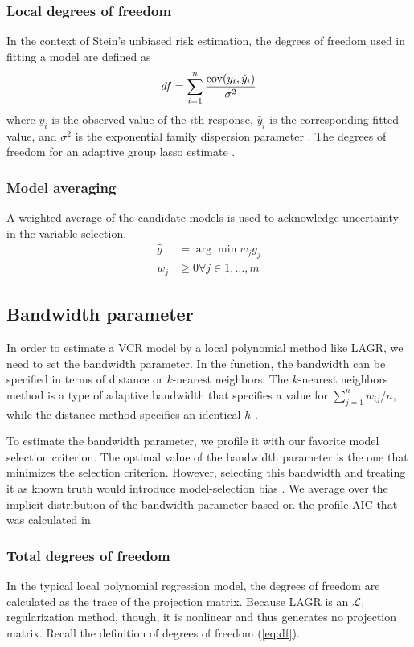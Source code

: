 \subsubsection{Local degrees of freedom}
In the context of Stein's unbiased risk estimation, the degrees of freedom used in fitting a model are defined as 
\begin{equation}
df = \sum_{i=1}^n \frac{{\rm cov}(y_i, \hat{y}_i)}{\sigma^2}
\end{equation}
where $y_i$ is the observed value of the $i$th response, $\hat{y}_i$ is the corresponding fitted value, and $\sigma^2$ is the exponential family dispersion parameter \citep{Efron-1986}. The degrees of freedom for an adaptive group lasso estimate \citep{Vaiter-Deledalle-Peyre-Fadili-Dossal-2012}.

\subsubsection{Model averaging}
A weighted average of the candidate models is used to acknowledge uncertainty in the variable selection. 
\begin{align}
\hat{g} &= \arg\!\min w_j g_j \\
w_j &\geq 0 \forall j \in 1, \dots, m
\end{align}

\subsection{Bandwidth parameter}
In order to estimate a VCR model by a local polynomial method like LAGR, we need to set the bandwidth parameter. In the  function, the bandwidth can be specified in terms of distance or $k$-nearest neighbors. The $k$-nearest neighbors method is a type of adaptive bandwidth that specifies a value for $\sum_{j=1}^n w_{ij} / n$, while the distance method specifies an identical $h$ .

To estimate the bandwidth parameter, we profile it with our favorite model selection criterion. The optimal value of the bandwidth parameter is the one that minimizes the selection criterion. However, selecting this bandwidth and treating it as known truth would introduce model-selection bias \citep{model-selection-bias-refs}. We average over the implicit distribution of the bandwidth parameter based on the profile AIC that was calculated in 

\subsubsection{Total degrees of freedom}
In the typical local polynomial regression model, the degrees of freedom are calculated as the trace of the projection matrix. Because LAGR is an $\mathcal{L}_1$ regularization method, though, it is nonlinear and thus generates no projection matrix. Recall the definition of degrees of freedom (\ref{eq:df}).

